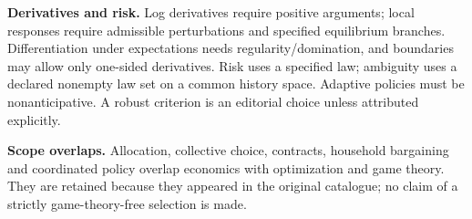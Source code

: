 \documentclass[11pt,a4paper]{article}
\begin{document}
\textbf{Derivatives and risk.} Log derivatives require positive arguments; local responses require admissible perturbations and specified equilibrium branches. Differentiation under expectations needs regularity/domination, and boundaries may allow only one-sided derivatives. Risk uses a specified law; ambiguity uses a declared nonempty law set on a common history space. Adaptive policies must be nonanticipative. A robust criterion is an editorial choice unless attributed explicitly.

\textbf{Scope overlaps.} Allocation, collective choice, contracts, household bargaining and coordinated policy overlap economics with optimization and game theory. They are retained because they appeared in the original catalogue; no claim of a strictly game-theory-free selection is made.
\end{document}
